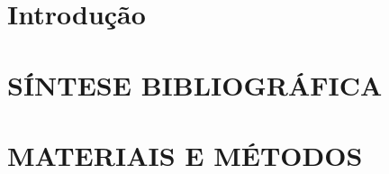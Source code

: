 \documentclass[12pt,oneside,a4paper,chapter=TITLE, english, french,	spanish, brazil]{abntex2-logatti}
\begin{document}


\setcounter{tocdepth}{0}
\tableofcontents
\cleardoublepage



\textual

\chapter*[Introdução]{Introdução}
%

\cleardoublepage
\chapter{SÍNTESE BIBLIOGRÁFICA}

\cleardoublepage
\chapter{MATERIAIS E MÉTODOS}






\postextual
\end{document}
